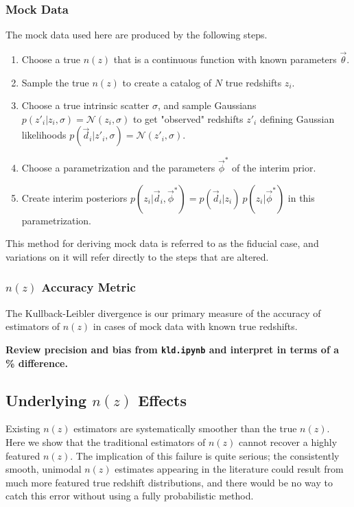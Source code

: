 \documentclass[iop]{emulateapj}
\begin{document}
\subsubsection{Mock Data}
\label{sec:mockdata}

The mock data used here are produced by the following steps.

\begin{enumerate}
	\item Choose a true $n(z)$ that is a continuous function with known 
parameters $\vec{\theta}$.
	\item Sample the true $n(z)$ to create a catalog of $N$ true redshifts 
$z_{i}$.
	\item Choose a true intrinsic scatter $\sigma$, and sample Gaussians 
$p(z'_{i} | z_{i}, \sigma) = \mathcal{N}(z_{i}, \sigma)$ to get "observed" 
redshifts $z'_{i}$ defining Gaussian likelihoods $p(\vec{d}_{i} | z'_{i}, 
\sigma) = \mathcal{N}(z'_{i}, \sigma)$.
	\item Choose a parametrization and the parameters $\vec{\phi}^{*}$ of 
the interim prior.
	\item Create interim posteriors $p(z_{i} | \vec{d}_{i}, \vec{\phi}^{*}) 
= p(\vec{d}_{i} | z_{i})\ p(z_{i} | \vec{\phi}^{*})$ in this parametrization.
\end{enumerate}

This method for deriving mock data is referred to as the fiducial case, and 
variations on it will refer directly to the steps that are altered.

\subsubsection{$n(z)$ Accuracy Metric}
\label{sec:accuracy}

The Kullback-Leibler divergence is our primary measure of the accuracy of 
estimators of $n(z)$ in cases of mock data with known true redshifts.

\textbf{Review precision and bias from \texttt{kld.ipynb} and interpret in 
terms of a \% difference.}

\subsection{Underlying $n(z)$ Effects}
\label{sec:truth}

Existing $n(z)$ estimators are systematically smoother than the true $n(z)$.  
Here we show that the traditional estimators of $n(z)$ cannot recover a highly 
featured $n(z)$.  The implication of this failure is quite serious; the 
consistently smooth, unimodal $n(z)$ estimates appearing in the literature 
could result from much more featured true redshift distributions, and there 
would be no way to catch this error without using a fully probabilistic method.
\end{document}
